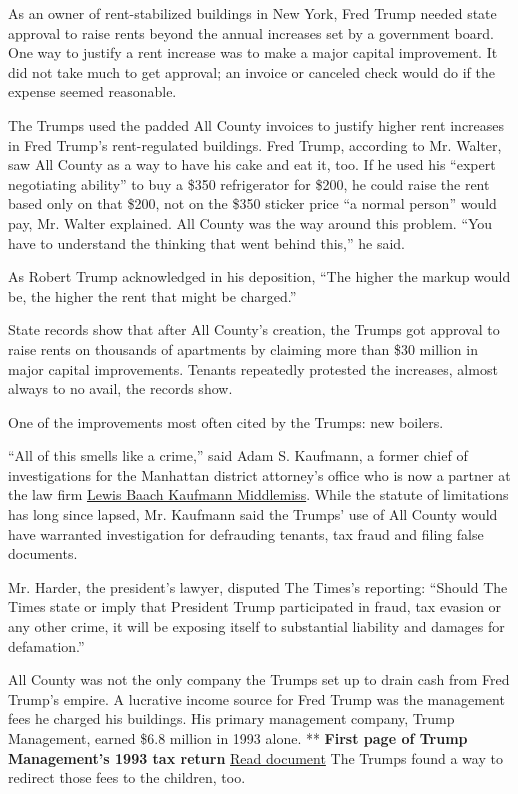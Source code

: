 As an owner of rent-stabilized buildings in New York, Fred Trump needed
state approval to raise rents beyond the annual increases set by a
government board. One way to justify a rent increase was to make a major
capital improvement. It did not take much to get approval; an invoice or
canceled check would do if the expense seemed reasonable.

The Trumps used the padded All County invoices to justify higher rent
increases in Fred Trump's rent-regulated buildings. Fred Trump,
according to Mr. Walter, saw All County as a way to have his cake and
eat it, too. If he used his ``expert negotiating ability'' to buy a
\$350 refrigerator for \$200, he could raise the rent based only on that
\$200, not on the \$350 sticker price ``a normal person'' would pay, Mr.
Walter explained. All County was the way around this problem. ``You have
to understand the thinking that went behind this,'' he said.

As Robert Trump acknowledged in his deposition, ``The higher the markup
would be, the higher the rent that might be charged.''

State records show that after All County's creation, the Trumps got
approval to raise rents on thousands of apartments by claiming more than
\$30 million in major capital improvements. Tenants repeatedly protested
the increases, almost always to no avail, the records show.

One of the improvements most often cited by the Trumps: new boilers.

``All of this smells like a crime,'' said Adam S. Kaufmann, a former
chief of investigations for the Manhattan district attorney's office who
is now a partner at the law firm
\href{http://www.lbkmlaw.com/attorneys-Adam-Kaufmann.html}{Lewis Baach
Kaufmann Middlemiss}. While the statute of limitations has long since
lapsed, Mr. Kaufmann said the Trumps' use of All County would have
warranted investigation for defrauding tenants, tax fraud and filing
false documents.

Mr. Harder, the president's lawyer, disputed The Times's reporting:
``Should The Times state or imply that President Trump participated in
fraud, tax evasion or any other crime, it will be exposing itself to
substantial liability and damages for defamation.''

All County was not the only company the Trumps set up to drain cash from
Fred Trump's empire. A lucrative income source for Fred Trump was the
management fees he charged his buildings. His primary management
company, Trump Management, earned \$6.8 million in 1993 alone. **
\textbf{First page of Trump Management's 1993 tax return}
\href{https://int.graylady3jvrrxbe.onion/data/documenthelper/131-trump-management-federal-tax-r/64042c0185c31172baee/optimized/full.pdf\#page=1}{Read
document} The Trumps found a way to redirect those fees to the children,
too.

